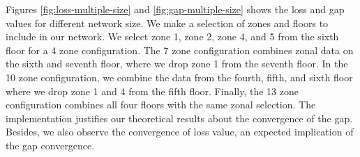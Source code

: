 Figures \ref{fig:loss-multiple-size} and \ref{fig:gap-multiple-size} shows the loss and gap values for different network size. We make a selection of zones and floors to include in our network. We select zone 1, zone 2, zone 4, and 5 from the sixth floor for a 4 zone configuration. The 7 zone configuration combines zonal data on the sixth and seventh floor, where we drop zone 1 from the seventh floor. In the 10 zone configuration, we combine the data from the fourth, fifth, and sixth floor where we drop zone 1 and 4 from the fifth floor. Finally, the 13 zone configuration combines all four floors with the same zonal selection. 
The implementation justifies our theoretical results about the convergence of the gap. Besides, we also observe the convergence of loss value, an expected implication of the gap convergence. 
%


